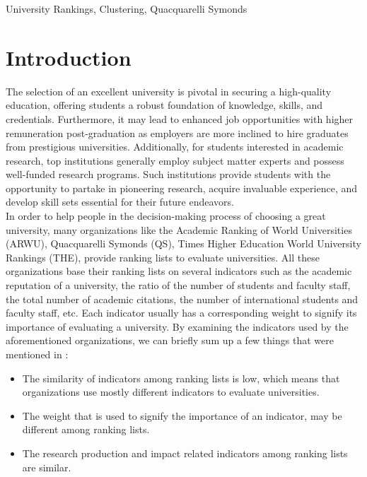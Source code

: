 \documentclass[conference]{IEEEtran}
\begin{document}
\begin{IEEEkeywords}
University Rankings, Clustering, Quacquarelli Symonds
\end{IEEEkeywords}

\section{Introduction}
The selection of an excellent university is pivotal in securing a high-quality education, offering students a robust foundation of knowledge, skills, and credentials. Furthermore, it may lead to enhanced job opportunities with higher remuneration post-graduation as employers are more inclined to hire graduates from prestigious universities. Additionally, for students interested in academic research, top institutions generally employ subject matter experts and possess well-funded research programs. Such institutions provide students with the opportunity to partake in pioneering research, acquire invaluable experience, and develop skill sets essential for their future endeavors. \\
In order to help people in the decision-making process of choosing a great university, many organizations like the Academic Ranking of World Universities (ARWU), Quacquarelli Symonds (QS), Times Higher Education World University Rankings (THE), provide ranking lists to evaluate universities. All these organizations base their ranking lists on several indicators such as the academic reputation of a university, the ratio of the number of students and faculty staff, the total number of academic citations, the number of international students and faculty staff, etc. Each indicator usually has a corresponding weight to signify its importance of evaluating a university. By examining the indicators used by the aforementioned organizations, we can briefly sum up a few things that were mentioned in \cite{b9}: \\

\begin{itemize}
    \item The similarity of indicators among ranking lists is low, which means that organizations use mostly different indicators to evaluate universities. 
    \item The weight that is used to signify the importance of an indicator, may be different among ranking lists. 
    \item The research production and impact related indicators among ranking lists are similar. \\
    
\end{itemize}
\end{document}

